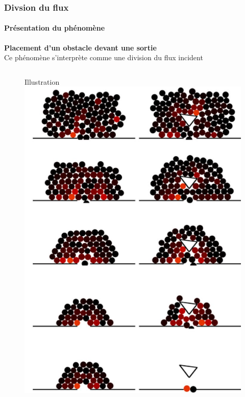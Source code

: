 \begin{frame}
    \frametitle{Divsion du flux}
    \framesubtitle{Présentation du phénomène}

    \textbf{Placement d'un obstacle devant une sortie} \\
    Ce phénomène s'interprète comme une division du flux incident

    \begin{columns}
        \begin{column}{0.475\textwidth}
            \begin{figure}
                Illustration
                \includegraphics[height=.58\textheight]{figures/Fig07}


            \end{figure}
        \end{column}


\end{columns}
\end{frame}

